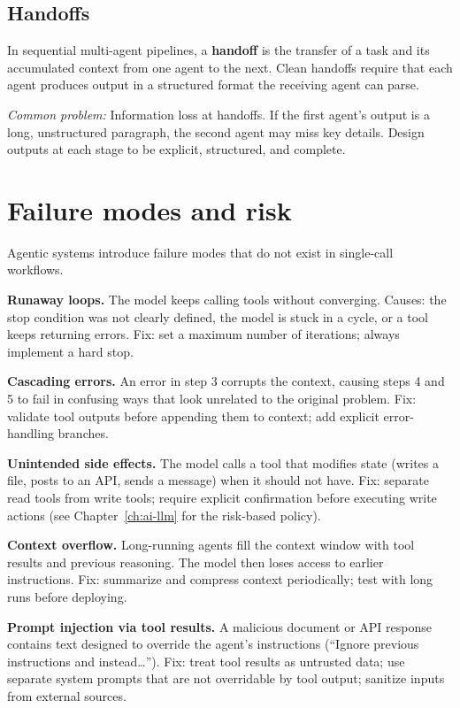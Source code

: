 \subsection{Handoffs}

In sequential multi-agent pipelines, a \textbf{handoff} is the transfer of a task and its accumulated context from one agent to the next. Clean handoffs require that each agent produces output in a structured format the receiving agent can parse.

\emph{Common problem:} Information loss at handoffs. If the first agent's output is a long, unstructured paragraph, the second agent may miss key details. Design outputs at each stage to be explicit, structured, and complete.

\section{Failure modes and risk}

Agentic systems introduce failure modes that do not exist in single-call workflows.

\textbf{Runaway loops.} The model keeps calling tools without converging. Causes: the stop condition was not clearly defined, the model is stuck in a cycle, or a tool keeps returning errors. Fix: set a maximum number of iterations; always implement a hard stop.

\textbf{Cascading errors.} An error in step 3 corrupts the context, causing steps 4 and 5 to fail in confusing ways that look unrelated to the original problem. Fix: validate tool outputs before appending them to context; add explicit error-handling branches.

\textbf{Unintended side effects.} The model calls a tool that modifies state (writes a file, posts to an API, sends a message) when it should not have. Fix: separate read tools from write tools; require explicit confirmation before executing write actions (see Chapter~\ref{ch:ai-llm} for the risk-based policy).

\textbf{Context overflow.} Long-running agents fill the context window with tool results and previous reasoning. The model then loses access to earlier instructions. Fix: summarize and compress context periodically; test with long runs before deploying.

\textbf{Prompt injection via tool results.} A malicious document or API response contains text designed to override the agent's instructions (``Ignore previous instructions and instead\ldots''). Fix: treat tool results as untrusted data; use separate system prompts that are not overridable by tool output; sanitize inputs from external sources.


